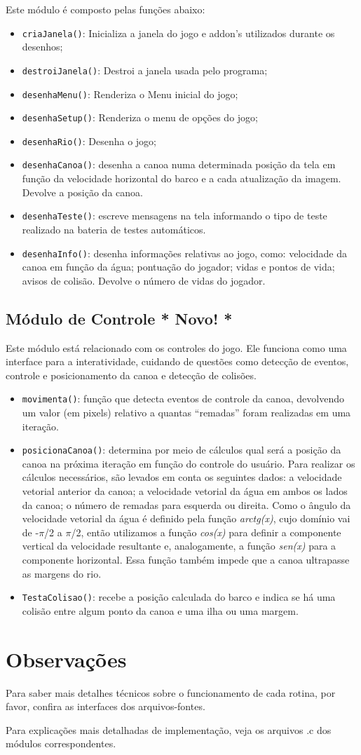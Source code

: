 \documentclass[11pt,a4paper]{article}
\begin{document}
Este módulo é composto pelas funções abaixo:
\begin{itemize}
\item \verb|criaJanela()|: Inicializa a janela do jogo e addon's utilizados durante os desenhos;
\item \verb|destroiJanela()|: Destroi a janela usada pelo programa;
\item \verb|desenhaMenu()|: Renderiza o Menu inicial do jogo;
\item \verb|desenhaSetup()|: Renderiza o menu de opções do jogo;
\item \verb|desenhaRio()|: Desenha o jogo;
\item \verb|desenhaCanoa()|: desenha a canoa numa determinada posição da tela em função da velocidade horizontal do barco e a cada atualização da imagem. Devolve a posição da canoa.
\item \verb|desenhaTeste()|: escreve mensagens na tela informando o tipo de teste realizado na bateria de testes automáticos.
\item \verb|desenhaInfo()|: desenha informações relativas ao jogo, como: velocidade da canoa em função da água; pontuação do jogador; vidas e pontos de vida; avisos de colisão. Devolve o número de vidas do jogador.
\end{itemize}

\subsection{Módulo de Controle \textbf{* Novo! *}}

Este módulo está relacionado com os controles do jogo. Ele funciona como uma interface para a interatividade, cuidando de questões como detecção de eventos, controle e posicionamento da canoa e detecção de colisões.

\begin{itemize}
\item \verb|movimenta()|: função que detecta eventos de controle da canoa, devolvendo um valor (em pixels) relativo a quantas “remadas” foram realizadas em uma iteração.
\item \verb|posicionaCanoa()|: determina por meio de cálculos qual será a posição da canoa na próxima iteração em função do controle do usuário. Para realizar os cálculos necessários, são levados em conta os seguintes dados: a velocidade vetorial anterior da canoa; a velocidade vetorial da água em ambos os lados da canoa; o número de remadas para esquerda ou direita. Como o ângulo da velocidade vetorial da água é definido pela função \textit{arctg(x)}, cujo domínio vai de -$\pi$/2 a $\pi$/2, então utilizamos a função \textit{cos(x)} para definir a componente vertical da velocidade resultante e, analogamente, a função \textit{sen(x)} para a componente horizontal.
Essa função também impede que a canoa ultrapasse as margens do rio.
\item \verb|TestaColisao()|: recebe a posição calculada do barco e indica se há uma colisão entre algum ponto da canoa e uma ilha ou uma margem.
\end{itemize}

\section{Observações}
Para saber mais detalhes técnicos sobre o funcionamento de cada rotina, por favor, confira as interfaces dos arquivos-fontes.

Para explicações mais detalhadas de implementação, veja os arquivos .c dos módulos correspondentes.
\end{document}
